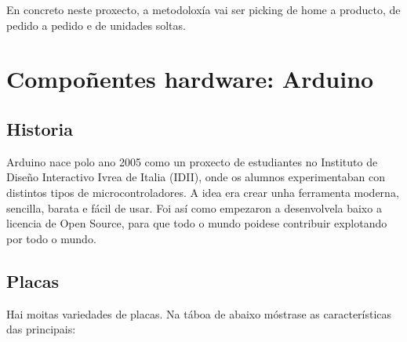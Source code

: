 \documentclass[11pt,twoside]{book}
\begin{document}
En concreto neste proxecto, a metodoloxía vai ser picking de home a producto, de pedido a pedido e de unidades soltas.

\chapter{Compoñentes hardware: Arduino}
\section{Historia}

Arduino nace polo ano 2005 como un proxecto de estudiantes no Instituto de Diseño Interactivo Ivrea de Italia (IDII), onde os alumnos experimentaban con distintos tipos de microcontroladores. A idea era crear unha ferramenta moderna, sencilla, barata e fácil de usar. Foi así como empezaron a desenvolvela baixo a licencia de Open Source, para que todo o mundo poidese contribuir explotando por todo o mundo.

\section{Placas}

Hai moitas variedades de placas. Na táboa de abaixo móstrase as características das principais:
\end{document}
